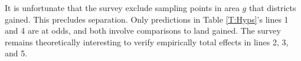 
It is unfortunate that the survey exclude sampling points in area $g$ that districts gained. This precludes separation. Only predictions in Table \ref{T:Hyps}'s lines 1 and 4 are at odds, and both involve comparisons to land gained. The survey remains theoretically interesting to verify empirically total effects in lines 2, 3, and 5. 



